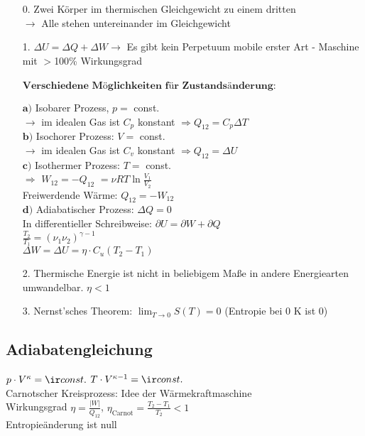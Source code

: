 \documentclass[german, 8pt]{latex4ei/latex4ei_sheet}
\begin{document}
\begin{itemize}
\item[0.] Zwei Körper im thermischen Gleichgewicht zu einem dritten\\ $\rightarrow$ Alle stehen untereinander im Gleichgewicht\\
\item[1.] $\Delta U = \Delta Q + \Delta W \rightarrow $ Es gibt kein Perpetuum mobile erster Art - Maschine mit $>$100\% Wirkungsgrad\\ \\
$\textbf{Verschiedene Möglichkeiten für Zustandsänderung:}$
\begin{sectionbox}
$\textbf{a)}$ Isobarer Prozess, $p =$ const.\\ $\rightarrow$ im idealen Gas ist $C_p$ konstant $\Rightarrow Q_{12} = C_p \Delta T$\\
$\textbf{b)}$ Isochorer Prozess: $V =$ const.\\ $\rightarrow$ im idealen Gas ist $C_v$ konstant $\Rightarrow Q_{12} = \Delta U$\\
$\textbf{c)}$ Isothermer Prozess: $T =$ const.\\ $\Rightarrow$ $W_{12} = -Q_{12}$ %
$ =\nu RT \ln\frac{V_1}{V_2}$
\\Freiwerdende Wärme: $Q_{12} = -W_{12}$\\
$\textbf{d)}$ Adiabatischer Prozess: $\Delta Q = 0$\\
In differentieller Schreibweise: $\partial U = \partial W + \partial Q $\\
$\frac{T_2}{T_1}=({\nu_1}{\nu_2})^{\gamma -1}$\\
$\Delta W = \Delta U = \eta \cdot C_u(T_2-T_1)$
\end{sectionbox}
\item[2.] Thermische Energie ist nicht in beliebigem Maße in andere Energiearten umwandelbar. $\eta < 1$
\item[3.] Nernst'sches Theorem: $\lim_{T \rightarrow 0} S(T) = 0$ (Entropie bei 0 K ist 0)\\
\end{itemize}

\subsection{Adiabatengleichung}
$p\cdot V^\kappa = \ir const.$ \qquad $T\cdot V^{\kappa -1} = \ir const.$ \\
Carnotscher Kreisprozess: Idee der Wärmekraftmaschine\\
Wirkungsgrad $\eta = \frac{\vert W\vert}{Q_{12}}$, $\eta_{\text{Carnot}} = \frac{T_2-T_1}{T_2} < 1$\\
Entropieänderung ist null
\end{document}
